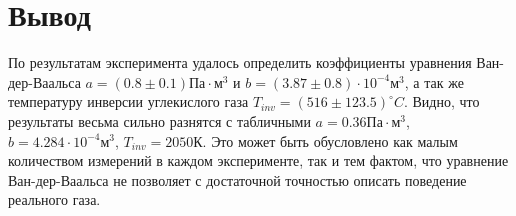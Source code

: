 \documentclass[12pt]{article}
\begin{document}
\section{Вывод}

По результатам эксперимента удалось определить коэффициенты уравнения Ван-дер-Ваальса $a = (0.8 \pm 0.1)\text{Па} \cdot\text{м}^3$ и $b = (3.87\pm 0.8)\cdot 10^{-4} \text{м}^3$, а так же температуру инверсии углекислого газа $T_{inv} = (516 \pm 123.5)^{\circ}C$.  Видно, что результаты весьма сильно разнятся с табличными $a = 0.36 \text{Па} \cdot \text{м}^3$, $b = 4.284 \cdot 10^{-4} \text{м}^3$, $T_{inv} = 2050 \text{К}$. Это может быть обусловлено как малым количеством измерений в каждом эксперименте, так и тем фактом, что уравнение Ван-дер-Ваальса не позволяет с достаточной точностью описать поведение реального газа.
\end{document}
